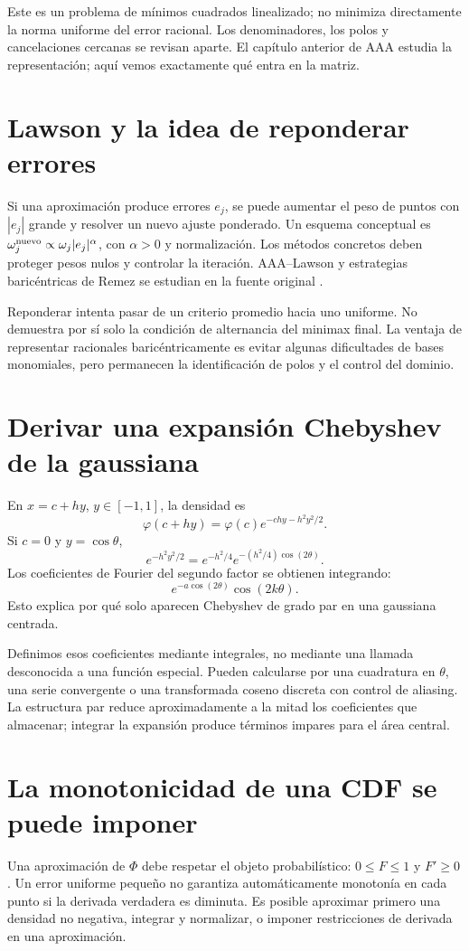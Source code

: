 \documentclass[11pt,a4paper]{article}
\theoremstyle{definition}
\newcounter{problema}
\begin{document}
Este es un problema de mínimos cuadrados linealizado; no minimiza directamente la norma uniforme del error racional.
Los denominadores, los polos y cancelaciones cercanas se revisan aparte.
El capítulo anterior de AAA estudia la representación; aquí vemos exactamente qué entra en la matriz.

\section{Lawson y la idea de reponderar errores}
Si una aproximación produce errores $e_j$, se puede aumentar el peso de puntos con $|e_j|$ grande y resolver un nuevo ajuste ponderado.
Un esquema conceptual es
$\omega_j^{\rm nuevo}\propto\omega_j|e_j|^\alpha$, con $\alpha>0$ y normalización.
Los métodos concretos deben proteger pesos nulos y controlar la iteración.
AAA--Lawson y estrategias baricéntricas de Remez se estudian en la fuente original \cite{lawsonactual}.

Reponderar intenta pasar de un criterio promedio hacia uno uniforme.
No demuestra por sí solo la condición de alternancia del minimax final.
La ventaja de representar racionales baricéntricamente es evitar algunas dificultades de bases monomiales, pero permanecen la identificación de polos y el control del dominio.

\section{Derivar una expansión Chebyshev de la gaussiana}
En $x=c+hy$, $y\in[-1,1]$, la densidad es
\[
\varphi(c+hy)=\varphi(c)e^{-chy-h^2y^2/2}.
\]
Si $c=0$ y $y=\cos\theta$,
\[
e^{-h^2y^2/2}
=e^{-h^2/4}e^{-(h^2/4)\cos(2\theta)}.
\]
Los coeficientes de Fourier del segundo factor se obtienen integrando:
\[
e^{-a\cos(2\theta)}\cos(2k\theta).
\]
Esto explica por qué solo aparecen Chebyshev de grado par en una gaussiana centrada.

Definimos esos coeficientes mediante integrales, no mediante una llamada desconocida a una función especial. Pueden calcularse por una cuadratura en $\theta$, una serie convergente o una transformada coseno discreta con control de aliasing.
La estructura par reduce aproximadamente a la mitad los coeficientes que almacenar; integrar la expansión produce términos impares para el área central.

\section{La monotonicidad de una CDF se puede imponer}
Una aproximación de $\Phi$ debe respetar el objeto probabilístico:
$0\le F\le1$ y $F'\ge0$.
Un error uniforme pequeño no garantiza automáticamente monotonía en cada punto si la derivada verdadera es diminuta.
Es posible aproximar primero una densidad no negativa, integrar y normalizar, o imponer restricciones de derivada en una aproximación.
\end{document}

